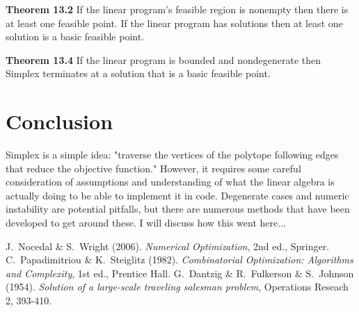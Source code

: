 \documentclass[12pt]{amsart}
\begin{document}
\textbf{Theorem 13.2} \cite{nocedalwright} If the linear program's feasible
region is nonempty then there is at least one feasible point. If the linear
program has solutions then at least one solution is a basic feasible point.

\textbf{Theorem 13.4} \cite{nocedalwright} If the linear program is bounded and
nondegenerate then Simplex terminates at a solution that is a basic feasible
point.

\section{Conclusion}

Simplex is a simple idea: "traverse the vertices of the polytope following edges
that reduce the objective function." However, it requires some careful
consideration of assumptions and understanding of what the linear algebra is
actually doing to be able to implement it in code. Degenerate cases and numeric
instability are potential pitfalls, but there are numerous methods that have
been developed to get around these. I will discuss how this went here...

\begin{thebibliography}{2}  %
J.~Nocedal \& S.~Wright (2006).
\textit{Numerical Optimization},
2nd ed., Springer.
C.~Papadimitriou \& K.~Steiglitz (1982).
\textit{Combinatorial Optimization: Algorithms and Complexity},
1st ed., Prentice Hall.
G.~Dantzig \& R.~Fulkerson \& S.~Johnson (1954).
\textit{Solution of a large-scale traveling salesman problem},
Operations Reseach 2, 393-410.
\end{thebibliography}
\end{document}
